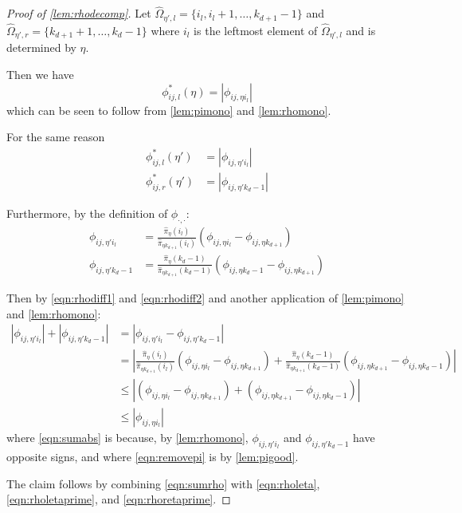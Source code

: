 \documentclass[a4paper, 12p]{article}
\numberwithin{equation}{section}
\newcommand{\Omorproj}{\hat{\Omega}}
\newcommand{\piorproj}{\hat{\pi}}
\begin{document}
\begin{proof}[Proof of \cref{lem:rhodecomp}]
    Let $\Omorproj_{\eta', l} = \{i_l, i_l + 1, \dots, k_{d+1} - 1\}$ and $\Omorproj_{\eta', r} = \{k_{d+1} + 1, \dots, k_{d} - 1\}$ where $i_l$ is the leftmost element of $\Omorproj_{\eta', l}$ and is determined by $\eta$.

    Then we have
    \begin{equation}
        \phi_{ij,l}^*(\eta) = |\phi_{ij,\eta i_l}| \label{eqn:rholeta}
    \end{equation}
    which can be seen to follow from \cref{lem:pimono} and \cref{lem:rhomono}.

    For the same reason
    \begin{align}
        \phi_{ij,l}^*(\eta') &= |\phi_{ij, \eta' i_l}| \label{eqn:rholetaprime}\\
        \phi_{ij,r}^*(\eta') &= |\phi_{ij, \eta' k_{d}-1}| \label{eqn:rhoretaprime}
    \end{align}

    Furthermore, by the definition of $\phi_{\cdot, \cdot}$:
    \begin{align}
        \phi_{ij,\eta' i_l} &= \frac{\piorproj_{\eta}(i_l)}{\piorproj_{\eta k_{d+1}}(i_l)}(\phi_{ij,\eta i_l} - \phi_{ij, \eta k_{d+1}}) \label{eqn:rhodiff1}\\
        \phi_{ij,\eta' k_d-1} &= \frac{\piorproj_{\eta}(k_d-1)}{\piorproj_{\eta k_{d+1}}(k_d-1)}(\phi_{ij,\eta k_d-1} - \phi_{ij, \eta k_{d+1}}) \label{eqn:rhodiff2}
    \end{align}

    Then by \eqref{eqn:rhodiff1} and \eqref{eqn:rhodiff2} and another application of \cref{lem:pimono} and \cref{lem:rhomono}:
    \begin{align}
        |\phi_{ij,\eta' i_l}| + |\phi_{ij,\eta' k_d - 1}| &= |\phi_{ij,\eta' i_l} - \phi_{ij, \eta' k_d - 1}| \label{eqn:sumabs}\\
        &=   \left|\frac{\piorproj_{\eta}(i_l)}{\piorproj_{\eta k_{d+1}}(i_l)}(\phi_{ij,\eta i_l} - \phi_{ij, \eta k_{d+1}}) + \frac{\piorproj_{\eta}(k_d-1)}{\piorproj_{\eta k_{d+1}}(k_d-1)}(\phi_{ij, \eta k_{d+1}} - \phi_{ij,\eta k_d-1})\right| \nonumber \\
        &\leq  \left|(\phi_{ij,\eta i_l} - \phi_{ij, \eta k_{d+1}}) + (\phi_{ij, \eta k_{d+1}} - \phi_{ij,\eta k_d-1})\right| \label{eqn:removepi}\\
        &\leq |\phi_{ij, \eta i_l}| \label{eqn:sumrho}
    \end{align}
    where \eqref{eqn:sumabs} is because, by \cref{lem:rhomono}, $\phi_{ij,\eta' i_l}$ and $\phi_{ij,\eta' k_d-1}$ have opposite signs, and where \eqref{eqn:removepi} is by \cref{lem:pigood}.

    The claim follows by combining \eqref{eqn:sumrho} with \eqref{eqn:rholeta}, \eqref{eqn:rholetaprime}, and \eqref{eqn:rhoretaprime}.
\end{proof}
\end{document}

